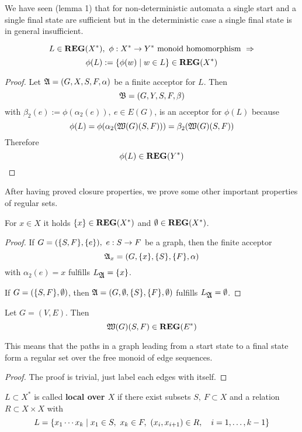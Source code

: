We have seen (lemma 1) that for non-deterministic automata a single start and a
single final state are sufficient but in the deterministic case a single final
state is in general insufficient.

\bigskip
\begin{theorem}
\[ L \in \mbox{{\bf REG}}(X^*),\ \phi : X^* \to Y^* \mbox{ monoid homomorphism }
\Rightarrow \]
\[ \phi(L) := \mbox{$\{\phi(w) \mid w \in L\}$} \in \mbox{{\bf REG}}(X^*) \]
\end{theorem}
\begin{proof}
Let $\mbox{$\mathfrak{A}$} = (G, X, S, F, \alpha)$ be a finite acceptor for $L$. Then \[
\mbox{$\mathfrak{B}$} = (G, Y, S, F, \beta)\] with $\beta_2(e) := \phi(\alpha_2(e)),\ e \in
E(G)$, is an acceptor for $\phi(L)$ because \[\phi(L) =
\phi(\alpha_2(\mbox{$\mathfrak{W}({G})$}(S, F))) = \beta_2(\mbox{$\mathfrak{W}({G})$}(S,F))\]
Therefore \[ \phi(L) \in \mbox{{\bf REG}}(Y^*) \]
\end{proof}

After having proved closure properties, we prove some other important properties
of regular sets.

\begin{lemma}
For $x \in X$ it holds $\mbox{$\{x\}$} \in \mbox{{\bf REG}}(X^*)$ and $\emptyset \in \mbox{{\bf REG}}(X^*)$.
\end{lemma}
\begin{proof}
If $G = (\mbox{$\{S,F\}$}, \mbox{$\{e\}$}),\ e: S \to F$ be a graph, then the finite
acceptor \[\mbox{$\mathfrak{A}$}_x = (G, \mbox{$\{x\}$}, \mbox{$\{S\}$}, \mbox{$\{F\}$}, \alpha)\] with $\alpha_2(e) =
x$ fulfills $L_{\mbox{$\mathfrak{A}$}} = \mbox{$\{x\}$}$.

If $G = (\mbox{$\{S,F\}$}, \emptyset)$, then $\mbox{$\mathfrak{A}$} = (G, \emptyset, \mbox{$\{S\}$},
\mbox{$\{F\}$}, \emptyset)$ fulfills $L_{\mbox{$\mathfrak{A}$}} = \emptyset$.
\end{proof}

\bigskip
\begin{lemma}
Let $G = (V, E)$. Then \[ \mbox{$\mathfrak{W}({G})$}(S,F) \in \mbox{{\bf REG}}(E^*) \]
\end{lemma}
This means that the paths in a graph leading from a start state to a final state
form a regular set over the free monoid of edge sequences. 
\begin{proof}
The proof is trivial, just label each edges with itself.
\end{proof}

\bigskip
\begin{definition}
$L \subset X^*$ is called {\bf local over $X$} if there exist subsets $S,\ F
\subset X$ and a relation $R \subset X \times X$ with 
\[ L = \mbox{$\{x_1 \cdots x_k \mid x_1 \in S,\ x_k \in F,\ (x_i, x_{i+1}) \in R,
\quad i = 1, \ldots, k - 1\}$} \]
\end{definition}

